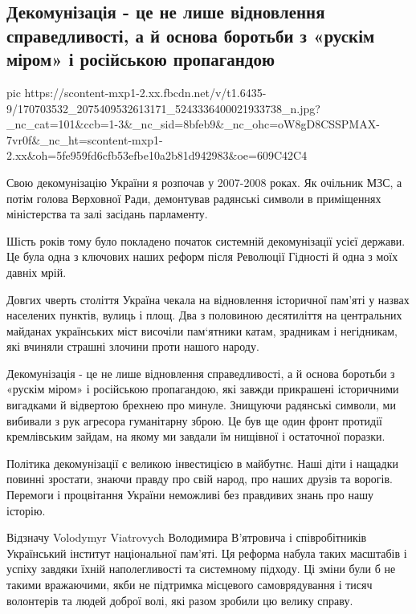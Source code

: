 
 
 
 
 
\subsection{Декомунізація - це не лише відновлення справедливості, а й основа боротьби з «рускім міром» і російською пропагандою}

\ifcmt
  pic https://scontent-mxp1-2.xx.fbcdn.net/v/t1.6435-9/170703532_2075409532613171_5243336400021933738_n.jpg?_nc_cat=101&ccb=1-3&_nc_sid=8bfeb9&_nc_ohc=oW8gD8CSSPMAX-7vr0f&_nc_ht=scontent-mxp1-2.xx&oh=5fe959fd6cfb53efbe10a2b81d942983&oe=609C42C4
\fi

Свою декомунізацію України я розпочав у 2007-2008 роках. Як очільник МЗС, а
потім голова Верховної Ради, демонтував радянські символи в приміщеннях
міністерства та залі засідань парламенту. 

Шість років тому було покладено початок системній декомунізації усієї держави.
Це була одна з ключових наших реформ після Революції Гідності й одна з моїх
давніх мрій. 

Довгих чверть століття Україна чекала на відновлення історичної пам’яті у
назвах населених пунктів, вулиць і площ. Два з половиною десятиліття на
центральних майданах українських міст височіли пам‘ятники катам, зрадникам і
негідникам, які вчиняли страшні злочини проти нашого народу. 

Декомунізація - це не лише відновлення справедливості, а й основа боротьби з
«рускім міром» і російською пропагандою, які завжди прикрашені історичними
вигадками й відвертою брехнею про минуле. Знищуючи радянські символи, ми
вибивали з рук агресора гуманітарну зброю. Це був ще один фронт протидії
кремлівським зайдам, на якому ми завдали їм нищівної і остаточної поразки. 

Політика декомунізації є великою інвестицією в майбутнє. Наші діти і нащадки
повинні зростати, знаючи правду про свій народ, про наших друзів та ворогів.
Перемоги і процвітання України неможливі без правдивих знань про нашу історію. 

Відзначу Volodymyr Viatrovych Володимира В’ятровича і співробітників
Український інститут національної пам'яті. Ця реформа набула таких масштабів і
успіху завдяки їхній наполегливості та системному підходу.  Ці зміни були б не
такими вражаючими, якби не підтримка місцевого самоврядування і тисяч
волонтерів та людей доброї волі, які разом зробили цю велику справу.
